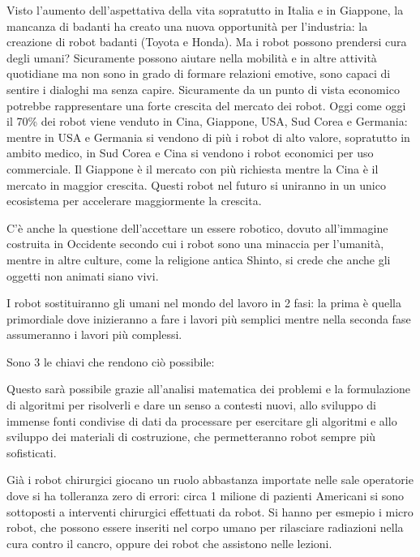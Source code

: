 \documentclass[a4page, 11pt]{article}
\begin{document}
Visto l'aumento dell'aspettativa della vita sopratutto in Italia e in Giappone, la mancanza di badanti ha creato una nuova opportunità per l'industria: la creazione di robot badanti (Toyota e Honda).
Ma i robot possono prendersi cura degli umani?
Sicuramente possono aiutare nella mobilità e in altre attività quotidiane ma non sono in grado di formare relazioni emotive, sono capaci di sentire i dialoghi ma senza capire.
Sicuramente da un punto di vista economico potrebbe rappresentare una forte crescita del mercato dei robot.
Oggi come oggi il 70\% dei robot viene venduto in Cina, Giappone, USA, Sud Corea e Germania: mentre in USA e Germania si vendono di più i robot di alto valore, sopratutto in ambito medico, in Sud Corea e Cina si vendono i robot economici per uso commerciale.
Il Giappone è il mercato con più richiesta mentre la Cina è il mercato in maggior crescita.
Questi robot nel futuro si uniranno in un unico ecosistema per accelerare maggiormente la crescita.

C'è anche la questione dell'accettare un essere robotico, dovuto all'immagine costruita in Occidente secondo cui i robot sono una minaccia per l'umanità, mentre in altre culture, come la religione antica Shinto, si crede che anche gli oggetti non animati siano vivi.

I robot sostituiranno gli umani nel mondo del lavoro in 2 fasi: la prima è quella primordiale dove inizieranno a fare i lavori più semplici mentre nella seconda fase assumeranno i lavori più complessi.

Sono 3 le chiavi che rendono ciò possibile:

Questo sarà possibile grazie all'analisi matematica dei problemi e la formulazione di algoritmi per risolverli e dare un senso a contesti nuovi, allo sviluppo di immense fonti condivise di dati da processare per esercitare gli algoritmi e allo sviluppo dei materiali di costruzione, che permetteranno robot sempre più sofisticati.

Già i robot chirurgici giocano un ruolo abbastanza importate nelle sale operatorie dove si ha tolleranza zero di errori: circa 1 milione di pazienti Americani si sono sottoposti a interventi chirurgici effettuati da robot.
Si hanno per esmepio i micro robot, che possono essere inseriti nel corpo umano per rilasciare radiazioni nella cura contro il cancro, oppure dei robot che assistono nelle lezioni.
\end{document}
